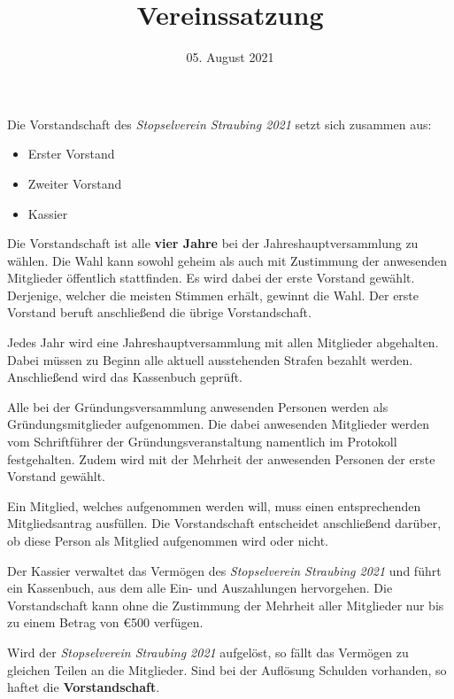 \documentclass[a4paper,12pt]{scrartcl}
\title{Vereinssatzung}
\author{\vereinsName}
\date{05. August 2021}
\newcommand{\vereinsName}{Stopselverein Straubing 2021}
\begin{document}
    \maketitle

    Die Vorstandschaft des \emph{\vereinsName} setzt sich zusammen aus:
    \begin{itemize}
        \item Erster Vorstand
        \item Zweiter Vorstand
        \item Kassier
    \end{itemize}

    Die Vorstandschaft ist alle \textbf{vier Jahre}
    bei der Jahreshauptversammlung zu wählen.
    Die Wahl kann sowohl geheim als auch mit Zustimmung der anwesenden Mitglieder
    öffentlich stattfinden.
    Es wird dabei der erste Vorstand gewählt.
    Derjenige, welcher die meisten Stimmen erhält, gewinnt die Wahl.
    Der erste Vorstand beruft anschließend die übrige Vorstandschaft.

    Jedes Jahr wird eine Jahreshauptversammlung mit allen Mitglieder abgehalten.
    Dabei müssen zu Beginn alle aktuell ausstehenden Strafen bezahlt werden.
    Anschließend wird das Kassenbuch geprüft.

    Alle bei der Gründungsversammlung anwesenden Personen werden als Gründungsmitglieder aufgenommen.
    Die dabei anwesenden Mitglieder werden vom Schriftführer der Gründungsveranstaltung namentlich im Protokoll festgehalten.
    Zudem wird mit der Mehrheit der anwesenden Personen der erste Vorstand gewählt.

    Ein Mitglied, welches aufgenommen werden will, muss einen entsprechenden Mitgliedsantrag ausfüllen.
    Die Vorstandschaft entscheidet anschließend darüber,
    ob diese Person als Mitglied aufgenommen wird oder nicht.

    Der Kassier verwaltet das Vermögen des \emph{\vereinsName} und führt ein Kassenbuch,
    aus dem alle Ein- und Auszahlungen hervorgehen.
    Die Vorstandschaft kann ohne die Zustimmung der Mehrheit aller Mitglieder
    nur bis zu einem Betrag von \euro{500} verfügen.

    Wird der \emph{\vereinsName} aufgelöst, so fällt das Vermögen zu gleichen Teilen an die Mitglieder.
    Sind bei der Auflösung Schulden vorhanden, so haftet die \textbf{Vorstandschaft}.
\end{document}
